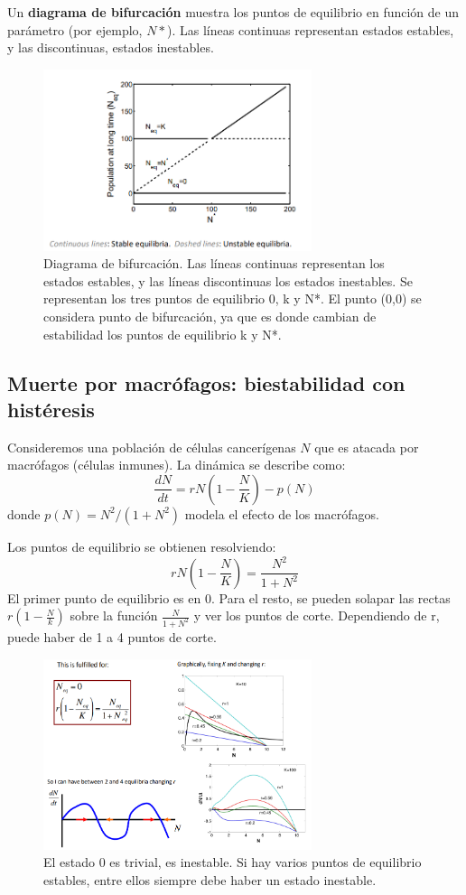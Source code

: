 Un \textbf{diagrama de bifurcación} muestra los puntos de equilibrio en función de un parámetro (por ejemplo, $N*$). Las líneas continuas representan estados estables, y las discontinuas, estados inestables.

\begin{figure}[h]
\centering
\includegraphics[width = 0.7\textwidth]{figs/bifurcation-diagram.png}
\caption{Diagrama de bifurcación. Las líneas continuas representan los estados estables, y las líneas discontinuas los estados inestables. Se representan los tres puntos de equilibrio 0, k y N*. El punto (0,0) se considera punto de bifurcación, ya que es donde cambian de estabilidad los puntos de equilibrio k y N*.}
\end{figure}

\subsection{Muerte por macrófagos: biestabilidad con histéresis}
Consideremos una población de células cancerígenas $N$ que es atacada por macrófagos (células inmunes). La dinámica se describe como:
$$\frac{dN}{dt} = rN(1 - \frac{N}{K}) - p(N)$$
donde $p(N) = N^2/(1 + N^2)$ modela el efecto de los macrófagos.

Los puntos de equilibrio se obtienen resolviendo:
$$rN(1 - \frac{N}{K}) = \frac{N^2}{1 + N^2}$$
El primer punto de equilibrio es en 0. Para el resto, se pueden solapar las rectas $r(1 - \frac{N}{k})$ sobre la función $\frac{N}{1 + N^2}$ y ver los puntos de corte. Dependiendo de r, puede haber de 1 a 4 puntos de corte. 

\begin{figure}[h]
\centering
\includegraphics[width = 0.7\textwidth]{figs/biestabilidad-histeresis.png}
\caption{El estado 0 es trivial, es inestable. Si hay varios puntos de equilibrio estables, entre ellos siempre debe haber un estado inestable.}
\end{figure}

